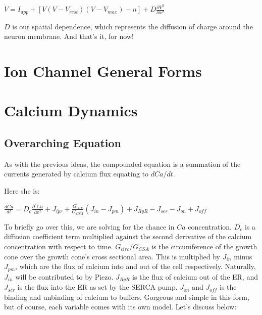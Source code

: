 \documentclass[12pt]{amsart}
\begin{document}
\bigskip

\begin{center}

    $\dot{V} = I_{app} + [V(V - V_{rest})(V - V_{max}) - n] +  D\frac{\partial V^2}{\partial x^2}$\\
    
\end{center}

\bigskip

$D$ is our spatial dependence, which represents the diffusion of charge around the neuron membrane. And that's it, for now! 

\section{Ion Channel General Forms}

\subsection{}

\section{Calcium Dynamics}

\subsection{Overarching Equation} As with the previous ideas, the compounded equation is a summation of the currents generated by calcium flux equating to $dCa / dt$.\newline

Here she is: 

\begin{center}

    $\frac{dCa}{dt} = D_c\frac{\partial^2 Ca}{\partial x^2} + J_{ipr} + \frac{G_{circ}}{G_{CSA}}(J_{in} - J_{pm}) + J_{RyR} - J_{ser} - J_{on} + J_{off}$

\end{center}

\bigskip

To briefly go over this, we are solving for the chance in $Ca$ concentration. $D_c$ is a diffusion coefficient term multiplied against the second derivative of the calcium concentration with respect to time. $G_{circ} / G_{CSA}$ is the circumference of the growth cone over the growth cone's cross sectional area. This is multiplied by $J_{in}$ minus $J_{pm}$, which are the flux of calcium into and out of the cell respectively. Naturally, $J_{in}$ will be contributed to by Piezo. $J_{RyR}$ is the flux of calcium out of the ER, and $J_{ser}$ is the flux into the ER as set by the SERCA pump. $J_{on}$ and $J_{off}$ is the binding and unbinding of calcium to buffers. Gorgeous and simple in this form, but of course, each variable comes with its own model. Let's discuss below: 
\end{document}
